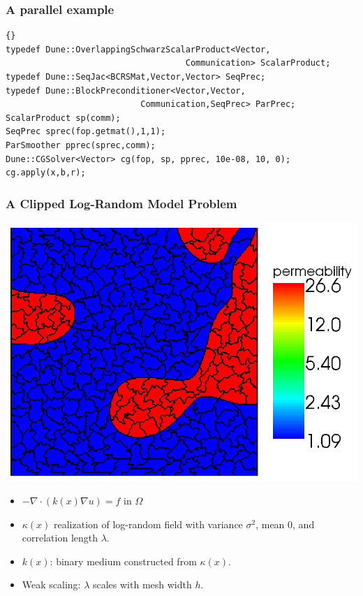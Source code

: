 \begin{frame}[fragile]
  \frametitle{A parallel example}
  \scriptsize
  \begin{lstlisting}{}
typedef Dune::OverlappingSchwarzScalarProduct<Vector,
                                    Communication> ScalarProduct;
typedef Dune::SeqJac<BCRSMat,Vector,Vector> SeqPrec;
typedef Dune::BlockPreconditioner<Vector,Vector,
                           Communication,SeqPrec> ParPrec;
ScalarProduct sp(comm);
SeqPrec sprec(fop.getmat(),1,1);
ParSmoother pprec(sprec,comm);
Dune::CGSolver<Vector> cg(fop, sp, pprec, 10e-08, 10, 0);
cg.apply(x,b,r);
\end{lstlisting}
\end{frame}

\begin{frame}
    \frametitle{A Clipped Log-Random Model Problem}
      \begin{center}
    \includegraphics[width=.4\textwidth]{EPS/aggregates_problem_f_2d_65536_cl015_var8_mean0}
  \end{center}

    \begin{itemize}
    \item $-\nabla \cdot (k(x) \nabla u) = f \text{ in }\Omega$
    \item $\kappa (x)$ realization of log-random field with variance
      $\sigma^2$, mean $0$, and correlation length $\lambda$.
    \item $k(x)$: binary medium constructed from $\kappa (x)$.
    \item Weak scaling: $\lambda$ scales with mesh width $h$.
    \end{itemize}
  \end{frame}

